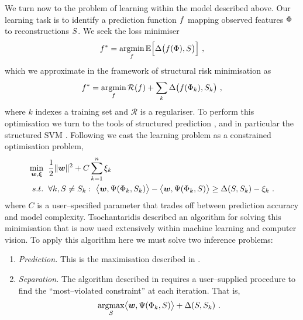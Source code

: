 We turn now to the problem of learning within the model described
above. Our learning task is to identify a prediction function
$\Predictor$ mapping observed features $\Features$ to reconstructions
$\Seam$. We seek the loss minimiser
\begin{equation}
  \OptPredictor = 
  \argmin_{\Predictor}\limits
  \Expected \Bigl[ 
    \Loss\bigl(\Predictor(\Features),\Seam\bigr)
    \Bigr] ~,
\end{equation}
which we approximate in the framework of structural risk minimisation as
\begin{equation}
  \OptPredictor = 
  \argmin_{\Predictor}\limits 
    \mathcal{R}(\Predictor) + \sum_k
      \Loss\bigl(\Predictor(\Features_k),\Seam_k\bigr) ~,
\end{equation}
where $k$ indexes a training set and $\mathcal{R}$ is a
regulariser. To perform this optimisation we turn to the tools of
structured prediction \cite{Bakir07}, and in particular the structured
SVM \cite{Tsochantaridis04}. Following \cite{Tsochantaridis04} we cast
the learning problem as a constrained optimisation problem,
\begin{equation}
  \begin{split}
    \min_{\Model,\Slacks} &
      \hspace{2mm} 
    \frac{1}{2} \|\Model\|^2 +
      C \sum_{k=1}^n \Slack_k\\
    s.t. & \hspace{2mm} \forall k, \Seam \neq \Seam_k:~
      \bigl\langle\Model, \JointFtr(\Features_k,\Seam_k)\bigr\rangle -
      \bigl\langle\Model, \JointFtr(\Features_k,\Seam)\bigr\rangle
      \geq
      \Loss(\Seam,\Seam_k) - \Slack_k ~.
  \end{split}
  \label{eq:svm-problem}
\end{equation}
where $C$ is a user--specified parameter that trades off between
prediction accuracy and model complexity. Tsochantaridis \etal
\cite{Tsochantaridis04} described an algorithm for solving this
minimisation that is now used extensively within machine learning and
computer vision. To apply this algorithm here we must solve two
inference problems:
\begin{enumerate}
  \item{\textit{Prediction.} This is the maximisation described in
    .}
  \item{\textit{Separation.} The algorithm described in
    \cite{Tsochantaridis04} requires a user--supplied procedure to
    find the ``most--violated constraint'' at each iteration. That is,
    \begin{equation}
      \argmax_{\Seam}\limits
        \bigl\langle\Model, \JointFtr(\Features_k,\Seam)\bigr\rangle
        + \Loss(\Seam,\Seam_k) ~.
        \label{eq:separation-problem}
    \end{equation}
  }
\end{enumerate}

